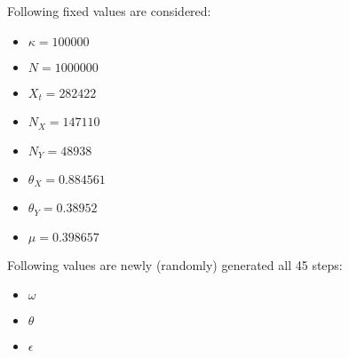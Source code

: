 Following fixed values are considered:
\begin{itemize}
\item $\kappa = 100000$
\item $N = 1000000$
\item $X_t = 282422$
\item $N_X = 147110$
\item $N_Y = 48938$
\item $\theta_X = 0.884561$
\item $\theta_Y = 0.38952$
\item $\mu = 0.398657$
\end{itemize}
Following values are newly (randomly) generated all 45 steps:
\begin{itemize}
\item $\omega$
\item $\theta$
\item $\epsilon$
\end{itemize}
